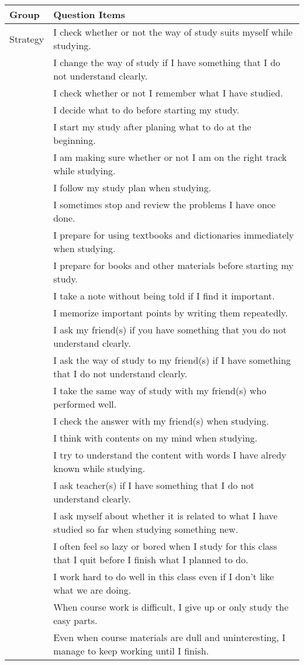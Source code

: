 \begin{tabular}{ll}
\hline \hline 
Group & Question Items \\
\hline 
Strategy & I check whether or not the way of study suits myself while studying. \\
 & I change the way of study if I have something that I do not understand clearly. \\
 & I check whether or not I remember what I have studied. \\
 & I decide what to do before starting my study. \\
 & I start my study after planing what to do at the beginning. \\
 & I am making sure whether or not I am on the right track while studying. \\
 & I follow my study plan when studying. \\
 & I sometimes stop and review the problems I have once done. \\
 & I prepare for using textbooks and dictionaries immediately when studying. \\
 & I prepare for books and other materials before starting my study. \\
 & I take a note without being told if I find it important. \\
 & I memorize important points by writing them repeatedly. \\
 & I ask my friend(s) if you have something that you do not understand clearly. \\
 & I ask the way of study to my friend(s) if I have something that I do not understand clearly. \\
 & I take the same way of study with my friend(s) who performed well. \\
 & I check the answer with my friend(s) when studying. \\
 & I think with contents on my mind when studying. \\
 & I try to understand the content with words I have alredy known while studying. \\
 & I ask teacher(s) if I have something that I do not understand clearly. \\
 & I ask myself about whether it is related to what I have studied so far when studying something new. \\
 & I often feel so lazy or bored when I study for this class that I quit before I finish what I planned to do. \\
 & I work hard to do well in this class even if I don't like what we are doing. \\
 & When course work is difficult, I give up or only study the easy parts. \\
 & Even when course materials are dull and uninteresting, I manage to keep working until I finish. \\
\hline \hline
\end{tabular}
